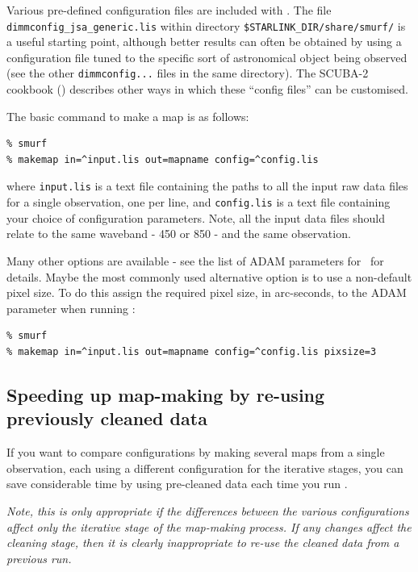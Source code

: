 \documentclass[oneside,11pt]{starlink}
\begin{document}
Various pre-defined configuration files are included with \SMURF. The
file \texttt{dimmconfig\_jsa\_generic.lis} within directory
\texttt{\$STARLINK\_DIR/share/smurf/} is a useful starting point,
although better results can often be obtained by using a configuration
file tuned to the specific sort of astronomical object being observed
(see the other \texttt{dimmconfig...} files in the same directory). The
SCUBA-2 cookbook (\SMURFcook) describes other ways in which these
``config files'' can be customised.

The basic command to make a map is as follows:
\begin{verbatim}
% smurf
% makemap in=^input.lis out=mapname config=^config.lis
\end{verbatim}

where \texttt{input.lis} is a text file containing the paths to all the
input raw data files for a single observation, one per line, and
\texttt{config.lis} is a text file containing your choice of
configuration parameters. Note, all the input data files should relate to
the same waveband - 450 or 850 - and the same observation.

Many other options are available - see the list of ADAM parameters for
\makemap\ for details. Maybe the most commonly used alternative option is
to use a non-default pixel size. To do this assign the required pixel
size, in arc-seconds, to the ADAM parameter  when
running \makemap:

\begin{verbatim}
% smurf
% makemap in=^input.lis out=mapname config=^config.lis pixsize=3
\end{verbatim}

\subsection{Speeding up map-making by re-using previously cleaned data}

If you want to compare configurations by making several maps from a
single observation, each using a different configuration for the
iterative stages, you can save considerable time by using pre-cleaned
data each time you run \makemap.

\emph{Note, this is only appropriate if the differences between the
various configurations affect only the iterative stage of the map-making
process. If any changes affect the cleaning stage, then it is clearly
inappropriate to re-use the cleaned data from a previous run.}
\end{document}
